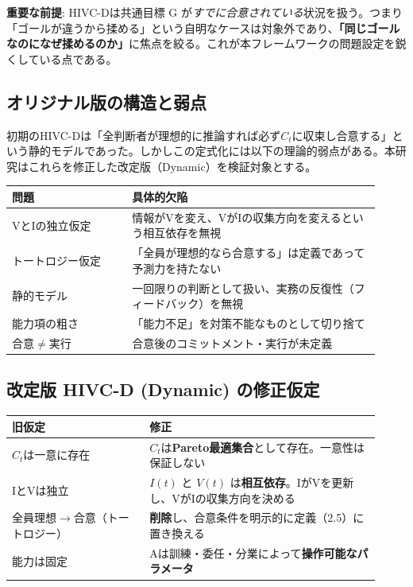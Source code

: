 \documentclass[11pt]{ltjsarticle}
\newcommand{\Ct}{\ensuremath{C_t}}
\begin{document}
\textbf{重要な前提}: HIVC-Dは共通目標 G が\textit{すでに合意されている}状況を扱う。つまり「ゴールが違うから揉める」という自明なケースは対象外であり、\textbf{「同じゴールなのになぜ揉めるのか」}に焦点を絞る。これが本フレームワークの問題設定を鋭くしている点である。

\subsection{オリジナル版の構造と弱点}

初期のHIVC-Dは「全判断者が理想的に推論すれば必ず\Ct{}に収束し合意する」という静的モデルであった。しかしこの定式化には以下の理論的弱点がある。本研究はこれらを修正した改定版（Dynamic）を検証対象とする。

\begin{longtable}{@{}p{0.30\linewidth} p{0.62\linewidth}@{}}
\toprule
問題 & 具体的欠陥 \\
\midrule
VとIの独立仮定 & 情報がVを変え、VがIの収集方向を変えるという相互依存を無視 \\
トートロジー仮定 & 「全員が理想的なら合意する」は定義であって予測力を持たない \\
静的モデル & 一回限りの判断として扱い、実務の反復性（フィードバック）を無視 \\
能力項の粗さ & 「能力不足」を対策不能なものとして切り捨て \\
合意$\neq$実行 & 合意後のコミットメント・実行が未定義 \\
\bottomrule
\end{longtable}

\subsection{改定版 HIVC-D (Dynamic) の修正仮定}

\begin{longtable}{@{}p{0.34\linewidth} p{0.58\linewidth}@{}}
\toprule
旧仮定 & 修正 \\
\midrule
\Ct{}は一意に存在 & \Ct{}は\textbf{Pareto最適集合}として存在。一意性は保証しない \\
IとVは独立 & $I(t)$ と $V(t)$ は\textbf{相互依存}。IがVを更新し、VがIの収集方向を決める \\
全員理想$\to$合意（トートロジー） & \textbf{削除}し、合意条件を明示的に定義（2.5）に置き換える \\
能力は固定 & Aは訓練・委任・分業によって\textbf{操作可能なパラメータ} \\
\bottomrule
\end{longtable}
\end{document}

